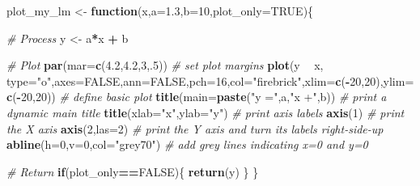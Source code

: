 \documentclass[
]{book}
\newenvironment{Shaded}{\begin{snugshade}}{\end{snugshade}}
\newcommand{\CommentTok}[1]{\textcolor[rgb]{0.56,0.35,0.01}{\textit{#1}}}
\newcommand{\ControlFlowTok}[1]{\textcolor[rgb]{0.13,0.29,0.53}{\textbf{#1}}}
\newcommand{\DataTypeTok}[1]{\textcolor[rgb]{0.13,0.29,0.53}{#1}}
\newcommand{\DecValTok}[1]{\textcolor[rgb]{0.00,0.00,0.81}{#1}}
\newcommand{\FloatTok}[1]{\textcolor[rgb]{0.00,0.00,0.81}{#1}}
\newcommand{\KeywordTok}[1]{\textcolor[rgb]{0.13,0.29,0.53}{\textbf{#1}}}
\newcommand{\NormalTok}[1]{#1}
\newcommand{\OperatorTok}[1]{\textcolor[rgb]{0.81,0.36,0.00}{\textbf{#1}}}
\newcommand{\OtherTok}[1]{\textcolor[rgb]{0.56,0.35,0.01}{#1}}
\newcommand{\StringTok}[1]{\textcolor[rgb]{0.31,0.60,0.02}{#1}}
\begin{document}
\begin{Shaded}
\begin{Highlighting}[]
\NormalTok{plot_my_lm <-}\StringTok{ }\ControlFlowTok{function}\NormalTok{(x,}\DataTypeTok{a=}\FloatTok{1.3}\NormalTok{,}\DataTypeTok{b=}\DecValTok{10}\NormalTok{,}\DataTypeTok{plot_only=}\OtherTok{TRUE}\NormalTok{)\{}
  
  \CommentTok{# Process}
\NormalTok{  y <-}\StringTok{ }\NormalTok{a}\OperatorTok{*}\NormalTok{x }\OperatorTok{+}\StringTok{ }\NormalTok{b}
  
  \CommentTok{# Plot}
  \KeywordTok{par}\NormalTok{(}\DataTypeTok{mar=}\KeywordTok{c}\NormalTok{(}\FloatTok{4.2}\NormalTok{,}\FloatTok{4.2}\NormalTok{,}\DecValTok{3}\NormalTok{,.}\DecValTok{5}\NormalTok{)) }\CommentTok{# set plot margins}
  \KeywordTok{plot}\NormalTok{(y }\OperatorTok{~}\StringTok{ }\NormalTok{x, }\DataTypeTok{type=}\StringTok{"o"}\NormalTok{,}\DataTypeTok{axes=}\OtherTok{FALSE}\NormalTok{,}\DataTypeTok{ann=}\OtherTok{FALSE}\NormalTok{,}\DataTypeTok{pch=}\DecValTok{16}\NormalTok{,}\DataTypeTok{col=}\StringTok{"firebrick"}\NormalTok{,}\DataTypeTok{xlim=}\KeywordTok{c}\NormalTok{(}\OperatorTok{-}\DecValTok{20}\NormalTok{,}\DecValTok{20}\NormalTok{),}\DataTypeTok{ylim=}\KeywordTok{c}\NormalTok{(}\OperatorTok{-}\DecValTok{20}\NormalTok{,}\DecValTok{20}\NormalTok{)) }\CommentTok{# define basic plot}
  \KeywordTok{title}\NormalTok{(}\DataTypeTok{main=}\KeywordTok{paste}\NormalTok{(}\StringTok{"y ="}\NormalTok{,a,}\StringTok{"x +"}\NormalTok{,b)) }\CommentTok{# print a dynamic main title}
  \KeywordTok{title}\NormalTok{(}\DataTypeTok{xlab=}\StringTok{"x"}\NormalTok{,}\DataTypeTok{ylab=}\StringTok{"y"}\NormalTok{)  }\CommentTok{# print axis labels}
  \KeywordTok{axis}\NormalTok{(}\DecValTok{1}\NormalTok{) }\CommentTok{# print the X axis}
  \KeywordTok{axis}\NormalTok{(}\DecValTok{2}\NormalTok{,}\DataTypeTok{las=}\DecValTok{2}\NormalTok{) }\CommentTok{# print the Y axis and turn its labels right-side-up}
  \KeywordTok{abline}\NormalTok{(}\DataTypeTok{h=}\DecValTok{0}\NormalTok{,}\DataTypeTok{v=}\DecValTok{0}\NormalTok{,}\DataTypeTok{col=}\StringTok{"grey70"}\NormalTok{) }\CommentTok{# add grey lines indicating x=0 and y=0}
  
  \CommentTok{# Return}
  \ControlFlowTok{if}\NormalTok{(plot_only}\OperatorTok{==}\OtherTok{FALSE}\NormalTok{)\{}
    \KeywordTok{return}\NormalTok{(y)}
\NormalTok{  \}}
\NormalTok{\}}
\end{Highlighting}
\end{Shaded}
\end{document}

